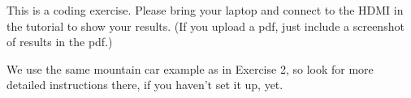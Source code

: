 



  
  



This is a coding exercise. Please bring your laptop and connect to the HDMI in the tutorial to show your results. (If you upload a pdf, just include a screenshot of results in the pdf.)

We use the same mountain car example as in Exercise 2, so look for more detailed instructions there, if you haven't set it up, yet.

